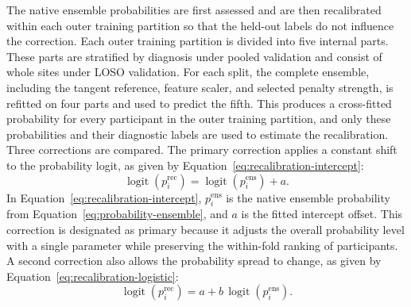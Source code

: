 The native ensemble probabilities are first assessed and are then recalibrated within each outer training partition so that the held-out labels do not influence the correction. Each outer training partition is divided into five internal parts. These parts are stratified by diagnosis under pooled validation and consist of whole sites under LOSO validation. For each split, the complete ensemble, including the tangent reference, feature scaler, and selected penalty strength, is refitted on four parts and used to predict the fifth. This produces a cross-fitted probability for every participant in the outer training partition, and only these probabilities and their diagnostic labels are used to estimate the recalibration. Three corrections are compared. The primary correction applies a constant shift to the probability logit, as given by Equation~\eqref{eq:recalibration-intercept}:
\begin{equation}
\operatorname{logit}\!\left(p_i^{\mathrm{rec}}\right)
=
\operatorname{logit}\!\left(p_i^{\mathrm{ens}}\right) + a .
\label{eq:recalibration-intercept}
\end{equation}
In Equation~\eqref{eq:recalibration-intercept}, $p_i^{\mathrm{ens}}$ is the native ensemble probability from Equation~\eqref{eq:probability-ensemble}, and $a$ is the fitted intercept offset. This correction is designated as primary because it adjusts the overall probability level with a single parameter while preserving the within-fold ranking of participants. A second correction also allows the probability spread to change, as given by Equation~\eqref{eq:recalibration-logistic}:
\begin{equation}
\operatorname{logit}\!\left(p_i^{\mathrm{rec}}\right)
=
a + b\,\operatorname{logit}\!\left(p_i^{\mathrm{ens}}\right).
\label{eq:recalibration-logistic}
\end{equation}
